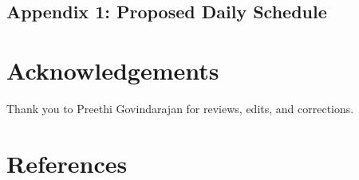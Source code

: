 \documentclass[a4paper, amsfonts, amssymb, amsmath, reprint, showkeys, nofootinbib, twoside]{revtex4-1}
\begin{document}
\subsection{Appendix 1: Proposed Daily Schedule}

\section*{Acknowledgements}

Thank you to Preethi Govindarajan for reviews, edits, and corrections.


\section*{References}

{}


%
%
%
%
%
%
%
% 
\end{document}
